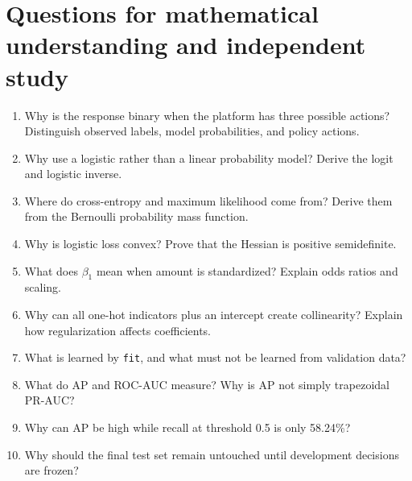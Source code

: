 \documentclass[11pt,a4paper]{article}
\begin{document}
\section{Questions for mathematical understanding and independent study}
\begin{enumerate}
\item Why is the response binary when the platform has three possible actions? Distinguish observed labels, model probabilities, and policy actions.
\item Why use a logistic rather than a linear probability model? Derive the logit and logistic inverse.
\item Where do cross-entropy and maximum likelihood come from? Derive them from the Bernoulli probability mass function.
\item Why is logistic loss convex? Prove that the Hessian is positive semidefinite.
\item What does $\beta_1$ mean when amount is standardized? Explain odds ratios and scaling.
\item Why can all one-hot indicators plus an intercept create collinearity? Explain how regularization affects coefficients.
\item What is learned by \texttt{fit}, and what must not be learned from validation data?
\item What do AP and ROC-AUC measure? Why is AP not simply trapezoidal PR-AUC?
\item Why can AP be high while recall at threshold 0.5 is only 58.24\%?
\item Why should the final test set remain untouched until development decisions are frozen?
\end{enumerate}
\end{document}
